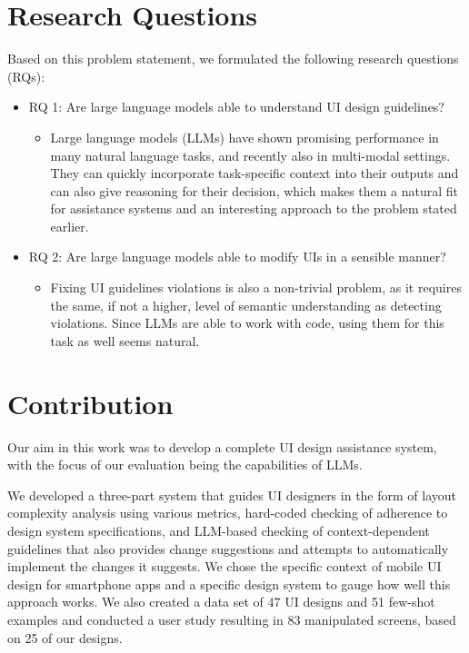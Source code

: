 \documentclass[11pt,titlepage,oneside,openany]{book}
\begin{document}
\section{Research Questions}\label{sec:rq_intro}
Based on this problem statement, we formulated the following research questions (RQs):
\begin{itemize}
	\item RQ 1: Are large language models able to understand UI design guidelines?
	\begin{itemize}
		\item Large language models (LLMs) have shown promising performance in many natural language tasks, and recently also in multi-modal settings. They can quickly incorporate task-specific context into their outputs and can also give reasoning for their decision, which makes them a natural fit for assistance systems and an interesting approach to the problem stated earlier.
	\end{itemize}
	\item RQ 2: Are large language models able to modify UIs in a sensible manner?
	\begin{itemize}
		\item Fixing UI guidelines violations is also a non-trivial problem, as it requires the same, if not a higher, level of semantic understanding as detecting violations. Since LLMs are able to work with code, using them for this task as well seems natural.
	\end{itemize}
\end{itemize}

\section{Contribution}

Our aim in this work was to develop a complete UI design assistance system, with the focus of our evaluation being the capabilities of LLMs.

We developed a three-part system that guides UI designers in the form of layout complexity analysis using various metrics, hard-coded checking of adherence to design system specifications, and LLM-based checking of context-dependent guidelines that also provides change suggestions and attempts to automatically implement the changes it suggests. We chose the specific context of mobile UI design for smartphone apps and a specific design system to gauge how well this approach works. We also created a data set of 47 UI designs and 51 few-shot examples and conducted a user study resulting in 83 manipulated screens, based on 25 of our designs. 
\end{document}
